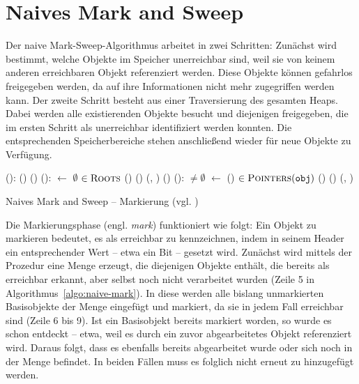 \section{Naives Mark and Sweep}
\label{sec:naive-mark-sweep}
Der naive Mark-Sweep-Algorithmus arbeitet in zwei Schritten:
Zunächst wird bestimmt, welche Objekte im Speicher unerreichbar sind, weil sie von keinem anderen erreichbaren Objekt referenziert werden.
Diese Objekte können gefahrlos freigegeben werden, da auf ihre Informationen nicht mehr zugegriffen werden kann.
Der zweite Schritt besteht aus einer Traversierung des gesamten Heaps.
Dabei werden alle existierenden Objekte besucht und diejenigen freigegeben, die im ersten Schritt als unerreichbar identifiziert werden konnten.
Die entsprechenden Speicherbereiche stehen anschließend wieder für neue Objekte zu Verfügung.

\begin{algorithm}
\begin{algorithmic}[1]
	\State {}():
	\State \quad {}()
	\State \quad {}()
	\Statex
	\State {}():
	\State \quad {} $\gets$ $\emptyset$				
	\State \quad \FOREACH {} $\in \textsc{Roots}$		
	\State \quad \quad \IF \NOT {}()
	\State \quad \quad \quad {}()	
	\State \quad \quad \quad {}(, )	
	\State \quad \quad \quad {}()			
	\Statex
	\State {}():
	\State \quad \WHILE {} $\neq \emptyset$
	\State \quad \quad {} $\gets$ ()			
	\State \quad \quad \FOREACH {} $\in \textsc{Pointers}(\texttt{obj})$	
	\State \quad \quad \quad \IF \NOT {}()
	\State \quad \quad \quad \quad {}()	
	\State \quad \quad \quad \quad {}(, )
\end{algorithmic}
\caption[Naives Mark and Sweep -- Markierung]{Naives Mark and Sweep -- Markierung (vgl. \cite[Kap. 2.2]{jones-lins})}
\label{algo:naive-mark}
\end{algorithm}

Die Markierungsphase (engl. \textit{mark}) funktioniert wie folgt:
Ein Objekt zu markieren bedeutet, es als erreichbar zu kennzeichnen, indem in seinem Header ein entsprechender Wert -- etwa ein Bit -- gesetzt wird.
Zunächst wird mittels der Prozedur  eine Menge  erzeugt, die diejenigen Objekte enthält, die bereits als erreichbar erkannt, aber selbst noch nicht verarbeitet wurden (Zeile 5 in Algorithmus~\ref{algo:naive-mark}).
In diese werden alle bislang unmarkierten Basisobjekte der Menge \Roots eingefügt und markiert, da sie in jedem Fall erreichbar sind (Zeile 6 bis 9).
Ist ein Basisobjekt bereits markiert worden, so wurde es schon entdeckt -- etwa, weil es durch ein zuvor abgearbeitetes Objekt referenziert wird.
Daraus folgt, dass es ebenfalls bereits abgearbeitet wurde oder sich noch in der Menge  befindet.
In beiden Fällen muss es folglich nicht erneut zu  hinzugefügt werden.

